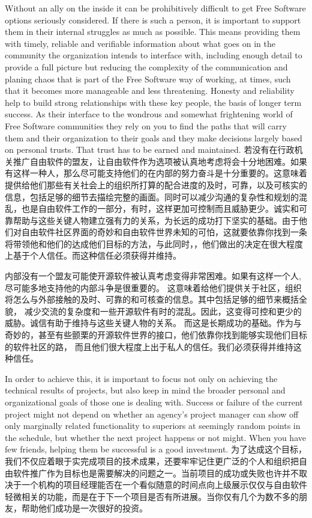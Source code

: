 Without an ally on the inside it can be prohibitively difficult to get
Free Software options seriously considered. If there is such a person, it is important
to support them in their internal struggles as much as possible. This
means providing them with timely, reliable and verifiable information about
what goes on in the community the organization intends to interface with,
including enough detail to provide a full picture but reducing the
complexity of the communication and planing chaos that is part of the Free
Software way of working, at times, such that it becomes more manageable and
less threatening. Honesty and reliability help to build strong
relationships with these key people, the basis of longer term success. As
their interface to the wondrous and somewhat frightening world of Free
Software communities they rely on you to find the paths that will carry
them and their organization to their goals and they make decisions largely
based on personal trusts. That trust has to be earned and maintained.
若没有在行政机关推广自由软件的盟友，让自由软件作为选项被认真地考虑将会十分地困难。如果有这样一种人，那么尽可能支持他们的在内部的努力奋斗是十分重要的。这意味着提供给他们那些有关社会上的组织所打算的配合进度的及时，可靠，以及可核实的信息，包括足够的细节去描绘完整的画面。同时可以减少沟通的复杂性和规划的混乱，也是自由软件工作的一部分，有时，这样更加可控制而且威胁更少。诚实和可靠帮助与这些关键人物建立强有力的关系，为长远的成功打下坚实的基础。由于他们对自由软件社区界面的奇妙和自由软件世界未知的可怕，这就要依靠你找到一条将带领他和他们的达成他们目标的方法，与此同时，，他们做出的决定在很大程度上基于个人信任。而这种信任必须获得并维持。

内部没有一个盟友可能使开源软件被认真考虑变得非常困难。如果有这样一个人,尽可能多地支持他的内部斗争是很重要的。
这意味着给他们提供关于社区，组织将怎么与外部接触的及时、可靠的和可核查的信息。其中包括足够的细节来概括全貌，
减少交流的复杂度和一些开源软件有时的混乱。因此，这变得可控和更少的威胁。诚信有助于维持与这些关键人物的关系。
而这是长期成功的基础。作为与奇妙的，甚至有些颤栗的开源软件世界的接口，他们依靠你找到能够实现他们目标的软件社区的路，
而且他们很大程度上出于私人的信任。我们必须获得并维持这种信任。


In order to achieve this, it is important to focus not only on achieving
the technical results of projects, but also keep in mind the broader personal and organizational
goals of those one is dealing with. Success or failure of the current
project might not depend on whether an agency's project manager can show off
only marginally related functionality to superiors at seemingly random points
in the schedule, but whether the next project happens or not might. When you have
few friends, helping them be successful is a good investment.
为了达成这个目标，我们不仅应着眼于实完成项目的技术成果，还要牢牢记住更广泛的个人和组织把自由软件推广作为目标也是需要解决的问题之一。当前项目的成功或失败也许并不取决于一个机构的项目经理能否在一个看似随意的时间点向上级展示仅仅与自由软件轻微相关的功能，而是在于下一个项目是否有所进展。当你仅有几个为数不多的朋友，帮助他们成功是一次很好的投资。

